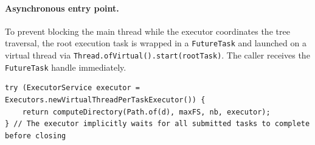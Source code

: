 \documentclass{scrartcl}
\begin{document}
\paragraph{Asynchronous entry point.}
To prevent blocking the main thread while the executor coordinates the tree traversal, the root execution task is wrapped in a \texttt{FutureTask} and launched on a virtual thread via \texttt{Thread.ofVirtual().start(rootTask)}. The caller receives the \texttt{FutureTask} handle immediately.

\begin{lstlisting}[style=java]
try (ExecutorService executor = Executors.newVirtualThreadPerTaskExecutor()) {
    return computeDirectory(Path.of(d), maxFS, nb, executor);
} // The executor implicitly waits for all submitted tasks to complete before closing
\end{lstlisting}
\end{document}
